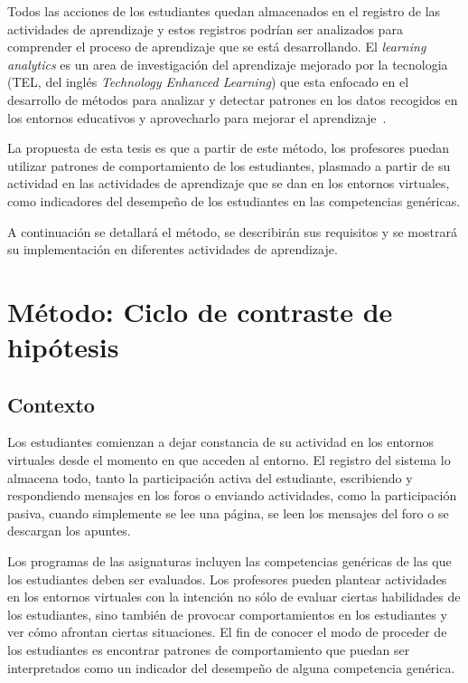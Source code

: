Todos las acciones de los estudiantes quedan almacenados en el registro de las actividades de aprendizaje y estos registros podrían ser analizados para comprender el proceso de aprendizaje que se está desarrollando. El \emph{learning analytics} es un area de investigación del aprendizaje mejorado por la tecnologia (TEL, del inglés \emph{Technology Enhanced Learning}) que esta enfocado en el desarrollo de métodos para analizar y detectar patrones en los datos recogidos en los entornos educativos y aprovecharlo para mejorar el aprendizaje~\cite{chatti2014learning}.

La propuesta de esta tesis es que a partir de este método, los profesores puedan utilizar patrones de comportamiento de los estudiantes, plasmado a partir de su actividad en las actividades de aprendizaje que se dan en los entornos virtuales, como indicadores del desempeño de los estudiantes en las competencias genéricas. 

A continuación se detallará el método, se describirán sus requisitos y se mostrará su implementación en diferentes actividades de aprendizaje.



\section{Método: Ciclo de contraste de hipótesis}

\subsection{Contexto}

Los estudiantes comienzan a dejar constancia de su actividad en los entornos virtuales desde el momento en que acceden al entorno. El registro del sistema lo almacena todo, tanto la participación activa del estudiante, escribiendo y respondiendo mensajes en los foros o enviando actividades, como la participación pasiva, cuando simplemente se lee una página, se leen los mensajes del foro o se descargan los apuntes. 

Los programas de las asignaturas incluyen las competencias genéricas de las que los estudiantes deben ser evaluados. Los profesores pueden plantear actividades en los entornos virtuales con la intención no sólo de evaluar ciertas habilidades de los estudiantes, sino también de provocar comportamientos en los estudiantes y ver cómo afrontan ciertas situaciones. El fin de conocer el modo de proceder de los estudiantes es encontrar patrones de comportamiento que puedan ser interpretados como un indicador del desempeño de alguna competencia genérica.

